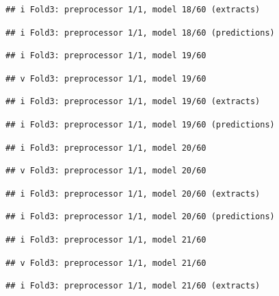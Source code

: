 \documentclass[
]{article}
\begin{document}
\begin{verbatim}
## i Fold3: preprocessor 1/1, model 18/60 (extracts)
\end{verbatim}

\begin{verbatim}
## i Fold3: preprocessor 1/1, model 18/60 (predictions)
\end{verbatim}

\begin{verbatim}
## i Fold3: preprocessor 1/1, model 19/60
\end{verbatim}

\begin{verbatim}
## v Fold3: preprocessor 1/1, model 19/60
\end{verbatim}

\begin{verbatim}
## i Fold3: preprocessor 1/1, model 19/60 (extracts)
\end{verbatim}

\begin{verbatim}
## i Fold3: preprocessor 1/1, model 19/60 (predictions)
\end{verbatim}

\begin{verbatim}
## i Fold3: preprocessor 1/1, model 20/60
\end{verbatim}

\begin{verbatim}
## v Fold3: preprocessor 1/1, model 20/60
\end{verbatim}

\begin{verbatim}
## i Fold3: preprocessor 1/1, model 20/60 (extracts)
\end{verbatim}

\begin{verbatim}
## i Fold3: preprocessor 1/1, model 20/60 (predictions)
\end{verbatim}

\begin{verbatim}
## i Fold3: preprocessor 1/1, model 21/60
\end{verbatim}

\begin{verbatim}
## v Fold3: preprocessor 1/1, model 21/60
\end{verbatim}

\begin{verbatim}
## i Fold3: preprocessor 1/1, model 21/60 (extracts)
\end{verbatim}
\end{document}
